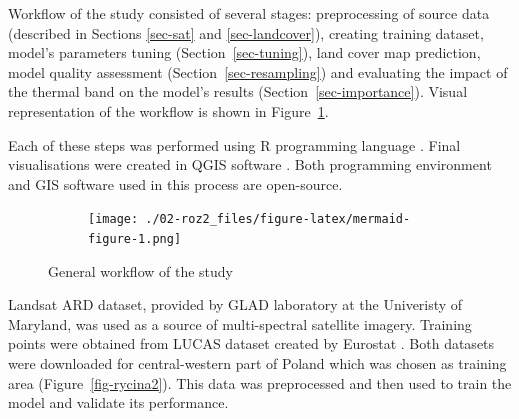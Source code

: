 \documentclass{amuthesis}
\begin{document}
Workflow of the study consisted of several stages: preprocessing of
source data (described in Sections \ref{sec-sat} and
\ref{sec-landcover}), creating training dataset, model's parameters
tuning (Section~\ref{sec-tuning}), land cover map prediction, model
quality assessment (Section~\ref{sec-resampling}) and evaluating the
impact of the thermal band on the model's results
(Section~\ref{sec-importance}). Visual representation of the workflow is
shown in Figure~\ref{fig-rycina1}.

Each of these steps was performed using R programming language
\autocite{R-base}. Final visualisations were created in QGIS software
\autocite{qgis_development_team_qgis_2009}. Both programming environment
and GIS software used in this process are open-source.

\begin{figure}

{\centering 

\begin{figure}[H]

{\centering \texttt{[image: ./02-roz2\_files/figure-latex/mermaid-figure-1.png]}

}

\end{figure}

}

\caption{\label{fig-rycina1}General workflow of the study}

\end{figure}

Landsat ARD dataset, provided by GLAD laboratory at the Univeristy of
Maryland, was used as a source of multi-spectral satellite imagery.
Training points were obtained from LUCAS dataset created by Eurostat
\autocite{dandrimont_harmonised_2020}. Both datasets were downloaded for
central-western part of Poland which was chosen as training area
(Figure~\ref{fig-rycina2}). This data was preprocessed and then used to
train the model and validate its performance.
\end{document}
